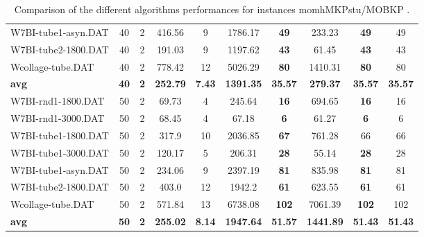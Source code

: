 \begin{table}[h]
\begin{tabular}{lccccccccc}
W7BI-tube1-asyn.DAT & 40 & 2 & 416.56 & 9 & 1786.17 &  \textbf{49} &  \textcolor{blue2}{233.23} &  \textbf{49}  & 49 \\
W7BI-tube2-1800.DAT & 40 & 2 & 191.03 & 9 & 1197.62 &  \textbf{43} &  \textcolor{blue2}{61.45} &  \textbf{43}  & 43 \\
Wcollage-tube.DAT & 40 & 2 &  \textcolor{blue2}{778.42} & 12 & 5026.29 &  \textbf{80} & 1410.31 &  \textbf{80}  & 80 \\
\cline{1-10} \textbf{avg} & \textbf{40} & \textbf{2} & \textbf{252.79} & \textbf{7.43} & \textbf{1391.35} & \textbf{35.57} & \textbf{279.37} & \textbf{35.57} & \textbf{35.57} \\ \cline{1-10}
W7BI-rnd1-1800.DAT & 50 & 2 &  \textcolor{blue2}{69.73} & 4 & 245.64 &  \textbf{16} & 694.65 &  \textbf{16}  & 16 \\
W7BI-rnd1-3000.DAT & 50 & 2 & 68.45 & 4 & 67.18 &  \textbf{6} &  \textcolor{blue2}{61.27} &  \textbf{6}  & 6 \\
W7BI-tube1-1800.DAT & 50 & 2 &  \textcolor{blue2}{317.9} & 10 & 2036.85 &  \textbf{67} & 761.28 & 66  & 66 \\
W7BI-tube1-3000.DAT & 50 & 2 & 120.17 & 5 & 206.31 &  \textbf{28} &  \textcolor{blue2}{55.14} &  \textbf{28}  & 28 \\
W7BI-tube1-asyn.DAT & 50 & 2 &  \textcolor{blue2}{234.06} & 9 & 2397.19 &  \textbf{81} & 835.98 &  \textbf{81}  & 81 \\
W7BI-tube2-1800.DAT & 50 & 2 &  \textcolor{blue2}{403.0} & 12 & 1942.2 &  \textbf{61} & 623.55 &  \textbf{61}  & 61 \\
Wcollage-tube.DAT & 50 & 2 &  \textcolor{blue2}{571.84} & 13 & 6738.08 &  \textbf{102} & 7061.39 &  \textbf{102}  & 102 \\
\cline{1-10} \textbf{avg} & \textbf{50} & \textbf{2} & \textbf{255.02} & \textbf{8.14} & \textbf{1947.64} & \textbf{51.57} & \textbf{1441.89} & \textbf{51.43} & \textbf{51.43} \\ \cline{1-10}
\bottomrule
\end{tabular}
\caption{Comparison of the different algorithms performances for instances momhMKPstu/MOBKP .}
\label{tab:table_compare_momhMKPstu/MOBKP }
\end{table}
